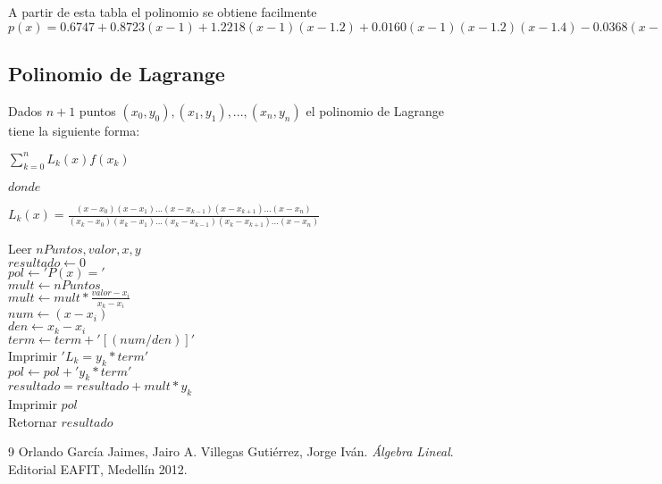 \documentclass[12pt]{article}
\begin{document}
        A partir de esta tabla el polinomio se obtiene facilmente\\
        $p(x) = 0.6747 + 0.8723(x - 1) + 1.2218(x - 1)(x - 1.2) + 0.0160(x - 1)(x - 1.2)(x - 1.4) - 0.0368(x - 1)(x - 1.2)(x - 1.4)(x - 1.6) + 0.0195(x - 1)(x - 1.2)(x- 1.4)(x - 1.6)(x - 1.8)(x -2)$\\    
        
        \subsection{Polinomio de Lagrange}
        Dados $n + 1$ puntos $(x_0, y_0), (x_1, y_1) , ..., (x_n, y_n)$ el polinomio de Lagrange tiene la siguiente forma:\\
        \begin{center}
            $\sum_{k=0}^{n} L_k(x)f(x_k)$\\ 
        \end{center}
        $donde$ \\ 
        \begin{center}
            $L_k(x) = \frac{(x-x_0)(x-x_1) ... (x-x_{k-1})(x-x_{k+1}) ... (x-x_n)}{(x_k-x_0)(x_k-x_1) ... (x_k-x_{k-1})(x_k-x_{k+1}) ... (x-x_n)}$\\
        \end{center}

        \begin{algorithm}[H]
            \caption{Algoritmo para obtener el polinomio de Lagrange}
            Leer $nPuntos, valor, x, y$\\
            $resultado \leftarrow 0$\\
            $pol \leftarrow 'P(x) = '$\\
            {
                $mult \leftarrow nPuntos$\\
                {
                    {
                        $mult \leftarrow mult * \frac{valor - x_i}{x_k - x_i}$\\
                        $num \leftarrow (x - x_i)$\\
                        $den \leftarrow x_k - x_i$\\
                        $term \leftarrow term + '[( num / den)]'$\\
                    }
                }
                Imprimir $'L_k = y_k * term'$\\
                $pol \leftarrow pol + 'y_k * term'$\\
                $resultado = resultado + mult * y_k$\\
            }
            Imprimir $pol$\\
            Retornar $resultado$\\
        \end{algorithm}

        \begin{thebibliography}{9}
            Orlando García Jaimes, Jairo A. Villegas Gutiérrez, Jorge Iván. \textit{Álgebra Lineal}. Editorial EAFIT, Medellín 2012. 
        \end{thebibliography}
    
\end{document}
